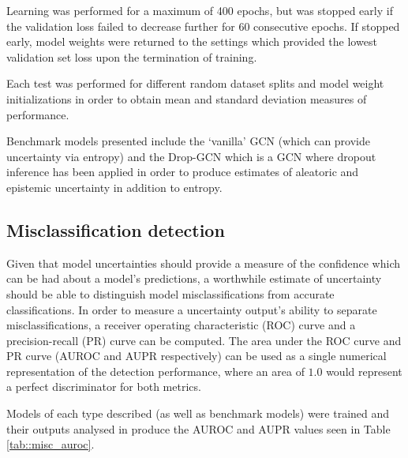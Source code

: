 \documentclass[
twocolumn,
]{ceurart}
\begin{document}
Learning was performed for a maximum of 400 epochs, but was stopped early if the validation loss failed to decrease further for 60 consecutive epochs.
If stopped early, model weights were returned to the settings which provided the lowest validation set loss upon the termination of training.
    
Each test was performed for different random dataset splits and model weight initializations in order to obtain mean and standard deviation measures of performance.

Benchmark models presented include the `vanilla' GCN (which can provide uncertainty via entropy) and the Drop-GCN which is a GCN where dropout inference has been applied in order to produce estimates of aleatoric and epistemic uncertainty in addition to entropy.

\subsection{Misclassification detection}

Given that model uncertainties should provide a measure of the confidence which can be had about a model's predictions, a worthwhile estimate of uncertainty should be able to distinguish model misclassifications from accurate classifications.
In order to measure a uncertainty output's ability to separate misclassifications, a receiver operating characteristic (ROC) curve and a precision-recall (PR) curve can be computed.
The area under the ROC curve and PR curve (AUROC and AUPR respectively) can be used as a single numerical representation of the detection performance, where an area of $1.0$ would represent a perfect discriminator for both metrics.

Models of each type described (as well as benchmark models) were trained and their outputs analysed in produce the AUROC and AUPR values seen in Table \ref{tab::misc_auroc}. 
\end{document}

